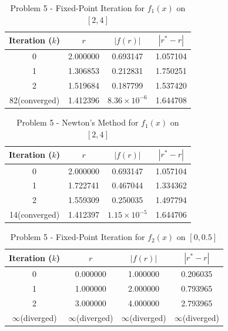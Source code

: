 \documentclass{article} %
\begin{document}
{    \clearpage
    \begin{table}[h!]
        \centering
        \begin{tabular}{cccc}
        \toprule
        Iteration ($k$) & $r$ & $|f(r)|$ & $|r^* - r|$ \\
        \midrule
        0 & 2.000000 & 0.693147 & 1.057104 \\
        1 & 1.306853 & 0.212831 & 1.750251 \\
        2 & 1.519684 & 0.187799 & 1.537420 \\
        82(converged) & 1.412396 & $8.36 \times 10^{-6}$ & 1.644708 \\
        \bottomrule
        \end{tabular}
        \caption{Problem 5 - Fixed-Point Iteration for $f_1(x)$ on $[2, 4]$}
        \label{tab:fixed_f1}
        \end{table}

        \begin{table}[h!]
        \centering
        \begin{tabular}{cccc}
        \toprule
        Iteration ($k$) & $r$ & $|f(r)|$ & $|r^* - r|$ \\
        \midrule
        0 & 2.000000 & 0.693147 & 1.057104 \\
        1 & 1.722741 & 0.467044 & 1.334362 \\
        2 & 1.559309 & 0.250035 & 1.497794 \\
        14(converged) & 1.412397 & $1.15 \times 10^{-5}$ & 1.644706 \\
        \bottomrule
        \end{tabular}
        \caption{Problem 5 - Newton's Method for $f_1(x)$ on $[2, 4]$}
        \label{tab:newton_f1}
        \end{table}

        \begin{table}[h!]
        \centering
        \begin{tabular}{cccc}
        \toprule
        Iteration ($k$) & $r$ & $|f(r)|$ & $|r^* - r|$ \\
        \midrule
        0 & 0.000000 & 1.000000 & 0.206035 \\
        1 & 1.000000 & 2.000000 & 0.793965 \\
        2 & 3.000000 & 4.000000 & 2.793965 \\
        $\infty$(diverged) & $\infty$(diverged) & $\infty$(diverged) & $\infty$(diverged) \\
        \bottomrule
        \end{tabular}
        \caption{Problem 5 - Fixed-Point Iteration for $f_2(x)$ on $[0, 0.5]$}
        \label{tab:fixed_f2}
        \end{table}

}
\end{document}
